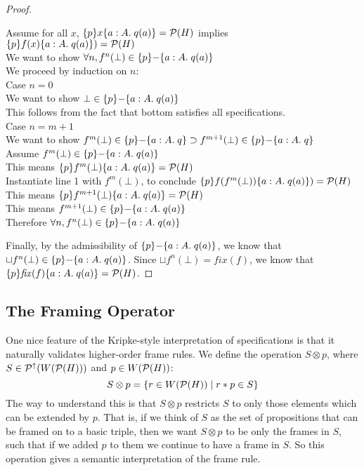 \begin{proof}
\begin{tabbedproof}
\oo Assume for all $x$, $\{{p}\}{x}\{{a:A}.\;{q(a)}\} = \mathcal{P}(H)$ implies $\{{p}\}{f(x)}\{{a:A}.\;{q(a)}\}) = \mathcal{P}(H)$ \\
\ooo We want to show $\forall n, f^n(\bot) \in \{{p}\}{-}\{{a:A}.\;{q(a)}\}$ \\ 
\ooo We proceed by induction on $n$: \\
\oooo Case $n = 0$ \\
\ooooo We want to show $\bot \in \{{p}\}{-}\{{a:A}.\;{q(a)}\}$ \\
\ooooo This follows from the fact that bottom satisfies all specifications. \\
\oooo Case $n = m + 1$ \\
\ooooo We want to show $f^m(\bot) \in \{{p}\}{-}\{{a:A}.\;{q}\} \supset
                        f^{m+1}(\bot) \in \{{p}\}{-}\{{a:A}.\;{q}\}$ \\
\ooooo Assume $f^m(\bot) \in \{{p}\}{-}\{{a:A}.\;{q(a)}\}$ \\
\oooooo This means $\{{p}\}{f^m(\bot)}\{{a:A}.\;{q(a)}\} = \mathcal{P}(H)$ \\
\oooooo Instantiate line 1 with $f^m(\bot)$, to conclude
          $\{{p}\}{f(f^m(\bot))}\{{a:A}.\;{q(a)}\}) = \mathcal{P}(H)$ \\
\oooooo This means $\{{p}\}{f^{m+1}(\bot)}\{{a:A}.\;{q(a)}\} = \mathcal{P}(H)$ \\
\oooooo This means $f^{m+1}(\bot) \in \{{p}\}{-}\{{a:A}.\;{q(a)}\}$ \\
\ooo Therefore $\forall n, f^n(\bot) \in \{{p}\}{-}\{{a:A}.\;{q(a)}\}$ \\ 
\end{tabbedproof}
Finally, by the admissibility of $\{{p}\}{-}\{{a:A}.\;{q(a)}\}$, we know that
$\sqcup f^n(\bot) \in \{{p}\}{-}\{{a:A}.\;{q(a)}\}$. Since $\sqcup f^n(\bot) = fix(f)$, we 
know that $\{{p}\}{\mathit{fix}(f)}\{{a:A}.\;{q(a)}\} = \mathcal{P}(H)$. 
\end{proof}

\subsection{The Framing Operator}

One nice feature of the Kripke-style interpretation of specifications
is that it naturally validates higher-order frame rules.  We define
the operation $S \otimes p$, where $S \in \mathcal{P}^{\uparrow}({W(\mathcal{P}(H))})$ and
$p \in W(\mathcal{P}(H))$:
\begin{displaymath}
S \otimes p = \{{{ r \in W(\mathcal{P}(H)) }\;|\;{ r * p \in S }}\}
\end{displaymath}
%
The way to understand this is that $S \otimes p$ restricts $S$ to only those
elements which can be extended by $p$. That is, if we think of $S$ as the
set of propositions that can be framed on to a basic triple, then we want
$S \otimes p$ to be only the frames in $S$, such that if we added $p$ to
them we continue to have a frame in $S$. So this operation gives a semantic
interpretation of the frame rule. 


